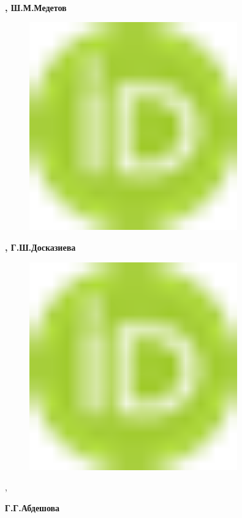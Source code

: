 {\bfseries \textsuperscript{\envelope },
Ш.М.Медетов}
\begin{figure}[H]
	\centering
	\includegraphics[width=0.8\textwidth]{media/gorn/image1}
	\caption*{}
\end{figure}
{\bfseries ,
Г.Ш.Досказиева}
\begin{figure}[H]
	\centering
	\includegraphics[width=0.8\textwidth]{media/gorn/image1}
	\caption*{}
\end{figure}
,

{\bfseries Г.Г.Абдешова}

